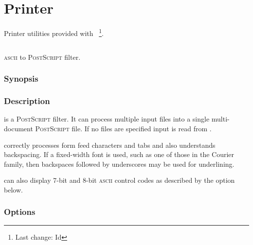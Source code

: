 \chapter{Printer}
\label{Printer}

Printer utilities provided with \aipspp\ \footnote{Last change:
$ $Id$ $}.


\section{}
\label{lwfa}

\textsc{ascii} to \textsc{PostScript} filter.

\subsection*{Synopsis}

\begin{synopsis}
\end{synopsis}

\subsection*{Description}

 is a \textsc{PostScript} filter.  It can process multiple input
files into a single multi-document \textsc{PostScript} file.  If no files are
specified input is read from .

 correctly processes form feed characters and tabs and also
understands backspacing.  If a fixed-width font is used, such as one of those
in the Courier family, then backspaces followed by underscores may be used for
underlining.

 can also display 7-bit and 8-bit \textsc{ascii} control codes as
described by the  option below.

\subsection*{Options}

